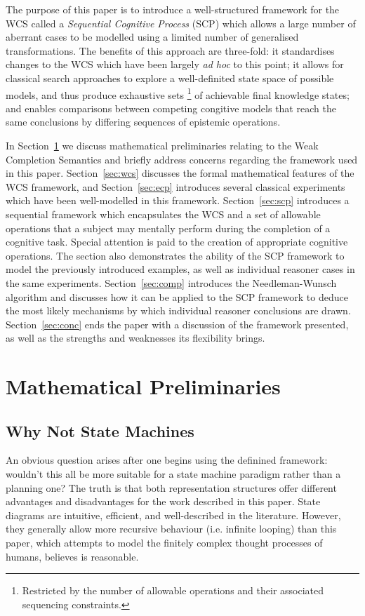 \documentclass{article}
\begin{document}
The purpose of this paper is to introduce a well-structured framework for the WCS called a \textit{Sequential Cognitive Process} (SCP) which allows a large number of aberrant cases to be modelled using a limited number of generalised transformations. The benefits of this approach are three-fold: it standardises changes to the WCS which have been largely \textit{ad hoc} to this point; it allows for classical search approaches to explore a well-definited state space of possible models, and thus produce exhaustive sets \footnote{Restricted by the number of allowable operations and their associated sequencing constraints.} of achievable final knowledge states; and enables comparisons between competing congitive models that reach the same conclusions by differing sequences of epistemic operations.

In Section~\ref{sec:prelim} we discuss mathematical preliminaries relating to the Weak Completion Semantics and briefly address concerns regarding the framework used in this paper. Section~\ref{sec:wcs} discusses the formal mathematical features of the WCS framework, and Section~\ref{sec:ecp} introduces several classical experiments which have been well-modelled in this framework. Section~\ref{sec:scp} introduces a sequential framework which encapsulates the WCS and a set of allowable operations that a subject may mentally perform during the completion of a cognitive task. Special attention is paid to the creation of appropriate cognitive operations. The section also demonstrates the ability of the SCP framework to model the previously introduced examples, as well as individual reasoner cases in the same experiments. Section~\ref{sec:comp} introduces the Needleman-Wunsch algorithm and discusses how it can be applied to the SCP framework to deduce the most likely mechanisms by which individual reasoner conclusions are drawn. Section~\ref{sec:conc} ends the paper with a discussion of the framework presented, as well as the strengths and weaknesses its flexibility brings.


\section{Mathematical Preliminaries} \label{sec:prelim}

\subsection{Why Not State Machines}
An obvious question arises after one begins using the definined framework: wouldn't this all be more suitable for a state machine paradigm rather than a planning one? The truth is that both representation structures offer different advantages and disadvantages for the work described in this paper. State diagrams are intuitive, efficient, and well-described in the literature. However, they generally allow more recursive behaviour (i.e. infinite looping) than this paper, which attempts to model the finitely complex thought processes of humans, believes is reasonable. 
\end{document}
